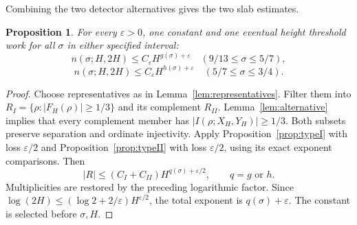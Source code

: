 \documentclass[11pt,a4paper,oneside]{article}
\newtheorem{proposition}[theorem]{Proposition}
\theoremstyle{definition}
\newcommand{\eps}{\varepsilon}
\numberwithin{equation}{section}
\begin{document}
Combining the two detector alternatives gives the two slab estimates.
\begin{proposition}\label{prop:slabs}
For every $\eps>0$, one constant and one eventual height threshold work
for all $\sigma$ in either specified interval:
\[
 n(\sigma;H,2H)\le C_\eps H^{g(\sigma)+\eps}
    \quad(9/13\le\sigma\le5/7),
\]
\[
 n(\sigma;H,2H)\le C_\eps H^{h(\sigma)+\eps}
    \quad(5/7\le\sigma\le3/4).
\]
\end{proposition}
\begin{proof}
Choose representatives as in Lemma~\ref{lem:representatives}.
Filter them into $R_I=\{\rho:|F_H(\rho)|\ge1/3\}$ and its complement
$R_{II}$. Lemma~\ref{lem:alternative} implies that every complement member
has $|I(\rho;X_H,Y_H)|\ge1/3$. Both subsets preserve separation and
ordinate injectivity. Apply Proposition~\ref{prop:typeI} with loss
$\eps/2$ and Proposition~\ref{prop:typeII} with loss $\eps/2$, using its
exact exponent comparisons. Then
\[
 |R|\le(C_I+C_{II})H^{q(\sigma)+\eps/2},
 \qquad q=g\text{ or }h.
\]
Multiplicities are restored by the preceding logarithmic factor.
Since $\log(2H)\le(\log2+2/\eps)H^{\eps/2}$, the total exponent is
$q(\sigma)+\eps$. The constant is selected before $\sigma,H$.
\end{proof}
\end{document}
